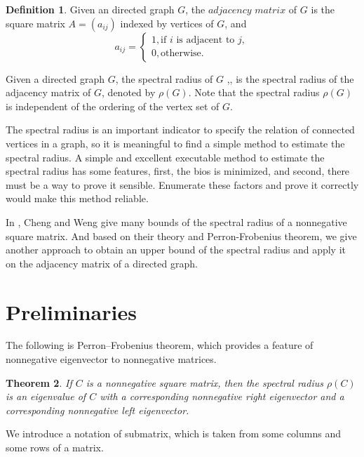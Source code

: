 \documentclass[12pt, a4paper]{article}
\theoremstyle{plain}
\newtheorem{thm}{Theorem}[section]
\theoremstyle{definition}
\newtheorem{defn}[thm]{Definition}
\begin{document}
\begin{defn}
Given an directed graph $G$, the $\textit{adjacency matrix}$ of
 $G$ is the square
 matrix $A = (a_{ij})$ indexed by vertices of $G$, and
     \[a_{ij} =\begin{cases}
        1, \text{if $i$ is adjacent to $j$}, \\
        0, \text{otherwise.}
            \end{cases}
     \]
\end{defn}

Given a directed graph $G$, the spectral radius of $G$ ,\cite{spec_rad}, is the
 spectral radius of the adjacency matrix of $G$, denoted by
 $\rho(G)$. Note that the spectral radius $\rho(G)$ is
 independent of the ordering of the vertex set of $G$.

The spectral radius is an important indicator to specify the relation
 of connected vertices in a graph, so it is meaningful to find a simple
 method to estimate the spectral radius. A simple and excellent
 executable method to estimate the spectral radius has some features,
 first, the bios is minimized, and second, there must be a way to prove
 it sensible. Enumerate these factors and prove it correctly would make this method reliable.

In \cite{chang}, Cheng and Weng give many bounds of the spectral radius of a nonnegative square matrix. And based on their theory and Perron-Frobenius theorem, we give another approach to obtain an upper bound of the spectral radius and apply it on the adjacency matrix of a directed graph.

\section{Preliminaries}

The following is Perron–Frobenius theorem, which provides a feature of
 nonnegative eigenvector to nonnegative matrices.

\begin{thm} \cite{prn_fros2} \label{thm:Perron_Frobenius}
    If $C$ is a nonnegative square matrix, then the spectral radius $\rho(C)$ is an
    eigenvalue of $C$ with a corresponding nonnegative right eigenvector and a
    corresponding nonnegative left eigenvector.
\end{thm}

We introduce a notation of submatrix, which is taken from some columns and some rows of a
 matrix.
\end{document}
